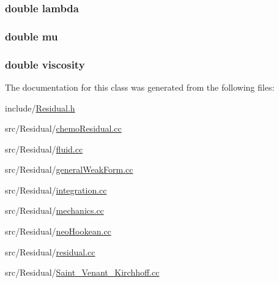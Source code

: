 \subsubsection[{lambda}]{\setlength{\rightskip}{0pt plus 5cm}double lambda}\label{class_residual_a3db359547eed8cfd48ca821d95f577af}
\subsubsection[{mu}]{\setlength{\rightskip}{0pt plus 5cm}double mu}\label{class_residual_a74577585cf12d1712ab9c57616d49205}
\subsubsection[{viscosity}]{\setlength{\rightskip}{0pt plus 5cm}double viscosity}\label{class_residual_ad80875e5d1c4362e2eae93663ad723fb}


The documentation for this class was generated from the following files\-:\begin{DoxyCompactItemize}
\item 
include/\hyperlink{_residual_8h}{Residual.\-h}\item 
src/\-Residual/\hyperlink{chemo_residual_8cc}{chemo\-Residual.\-cc}\item 
src/\-Residual/\hyperlink{fluid_8cc}{fluid.\-cc}\item 
src/\-Residual/\hyperlink{general_weak_form_8cc}{general\-Weak\-Form.\-cc}\item 
src/\-Residual/\hyperlink{integration_8cc}{integration.\-cc}\item 
src/\-Residual/\hyperlink{mechanics_8cc}{mechanics.\-cc}\item 
src/\-Residual/\hyperlink{neo_hookean_8cc}{neo\-Hookean.\-cc}\item 
src/\-Residual/\hyperlink{residual_8cc}{residual.\-cc}\item 
src/\-Residual/\hyperlink{_saint___venant___kirchhoff_8cc}{Saint\-\_\-\-Venant\-\_\-\-Kirchhoff.\-cc}\end{DoxyCompactItemize}
